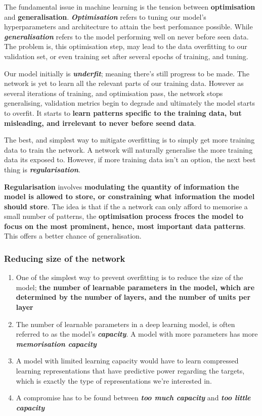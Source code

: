 \documentclass[12pt, a4paper]{article}
\begin{document}
The fundamental issue in machine learning is the tension between \textbf{optimisation} and \textbf{generalisation}.
\textbf{\textit{Optimisation} }refers to tuning our model's hyperparameters and architecture to attain the best perfomance possible.
While \textbf{\textit{generalisation}} refers to the model performing well on never before seen data.
The problem is, this optimisation step, may lead to the data overfitting to our validation set, or even training set after 
several epochs of training, and tuning.

Our model initially is \textbf{\textit{underfit}}; meaning there's still progress to be made. The network is yet to learn all the 
relevant parts of our training data. However as several iterations of training, and optimisation pass,
the network stops generalising, validation metrics begin to degrade and ultimately the model 
starts to overfit. It starts to \textbf{learn patterns specific to the training data, but misleading, and irrelevant to never before seend data}.

The best, and simplest way to mitigate overfitting is to simply get more 
training data to train the network. A network will naturally generalise the more 
training data its exposed to. However, if more training data isn't an option,
the next best thing is \textbf{\textit{regularisation}}.

\textbf{Regularisation} involves \textbf{modulating the quantity of information 
the model is allowed to store, or constraining what information the model 
should store}. The idea is that if the a network can only afford to memorise a 
small number of patterns, the \textbf{optimisation process froces the model to focus on 
the most prominent, hence, most important data patterns}. This offers a better chance 
of generalisation.

\subsubsection{Reducing size of the network}
\begin{enumerate}
   \item One of the simplest way to prevent overfitting is to reduce the size of the model;
   \textbf{the number of learnable parameters in the model, which are determined by the number of 
   layers, and the number of units per layer}
   \item The number of learnable parameters in a deep learning model, is often referred to 
   as the model's \textbf{\textit{capacity}}. A model with more parameters has 
   more \textbf{\textit{memorisation capacity}}
   \item A model with limited learning capacity would have to learn compressed 
   learning representations that have predictive  power regarding the targets, which is exactly the 
   type of representations we're interested in. 
   \item A compromise has to be found between \textbf{\textit{too much capacity}} and 
   \textbf{\textit{too little capacity}}
\end{enumerate}
\end{document}
